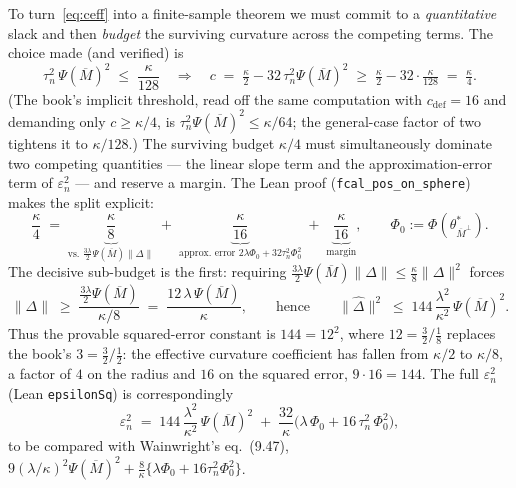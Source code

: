 \documentclass[11pt]{article}
\theoremstyle{definition}
\newcommand{\thetast}{\theta^{*}}
\newcommand{\Mbar}{\overline{M}}
\newcommand{\Mbarperp}{\overline{M}^{\perp}}
\newcommand{\PsM}{\Psi(\Mbar)}
\newcommand{\norm}[1]{\lVert #1 \rVert}
\begin{document}
To turn~\eqref{eq:ceff} into a finite-sample theorem we must commit to a \emph{quantitative} slack and
then \emph{budget} the surviving curvature across the competing terms. The choice made (and verified) is
\begin{equation}\label{eq:slack}
  \tau_n^2\,\PsM^2 \;\le\; \frac{\kappa}{128}
  \quad\Longrightarrow\quad
  c \;=\; \tfrac{\kappa}{2}-32\,\tau_n^2\PsM^2 \;\ge\; \tfrac{\kappa}{2}-32\cdot\tfrac{\kappa}{128}
        \;=\; \tfrac{\kappa}{4}.
\end{equation}
(The book's implicit threshold, read off the same computation with $c_{\mathrm{def}}=16$ and demanding
only $c\ge\kappa/4$, is $\tau_n^2\PsM^2\le\kappa/64$; the general-case factor of two tightens it to
$\kappa/128$.) The surviving budget $\kappa/4$ must simultaneously dominate two competing quantities ---
the linear slope term and the approximation-error term of $\varepsilon_n^2$ --- and reserve a margin.
The Lean proof (\texttt{fcal\_pos\_on\_sphere}) makes the split explicit:
\begin{equation}\label{eq:split}
  \frac{\kappa}{4}\;=\;\underbrace{\frac{\kappa}{8}}_{\text{vs.\ }\frac{3\lambda}{2}\PsM\norm{\Delta}}
                   \;+\;\underbrace{\frac{\kappa}{16}}_{\text{approx.\ error }2\lambda\Phi_0+32\tau_n^2\Phi_0^2}
                   \;+\;\underbrace{\frac{\kappa}{16}}_{\text{margin}},
  \qquad \Phi_0:=\Phi(\thetast_{\Mbarperp}).
\end{equation}
The decisive sub-budget is the first: requiring $\tfrac{3\lambda}{2}\PsM\norm{\Delta}\le\tfrac{\kappa}{8}\norm{\Delta}^2$
forces
\begin{equation}\label{eq:radius}
  \norm{\Delta} \;\ge\; \frac{\tfrac{3\lambda}{2}\PsM}{\kappa/8} \;=\; \frac{12\,\lambda\,\PsM}{\kappa},
  \qquad\text{hence}\qquad
  \norm{\widehat\Delta}^2 \;\le\; 144\,\frac{\lambda^2}{\kappa^2}\,\PsM^2 .
\end{equation}
Thus the provable squared-error constant is $144=12^2$, where $12 = \tfrac{3}{2}\big/\tfrac{1}{8}$
replaces the book's $3 = \tfrac{3}{2}\big/\tfrac{1}{2}$: the effective curvature coefficient has fallen
from $\kappa/2$ to $\kappa/8$, a factor of $4$ on the radius and $16$ on the squared error,
$9\cdot16=144$. The full $\varepsilon_n^2$ (Lean \texttt{epsilonSq}) is correspondingly
\[
  \varepsilon_n^2 \;=\; 144\,\frac{\lambda^2}{\kappa^2}\,\PsM^2
     \;+\; \frac{32}{\kappa}\Big(\lambda\,\Phi_0 + 16\,\tau_n^2\,\Phi_0^2\Big),
\]
to be compared with Wainwright's eq.~(9.47), $9(\lambda/\kappa)^2\PsM^2+\tfrac{8}{\kappa}\{\lambda\Phi_0+16\tau_n^2\Phi_0^2\}$.
\end{document}
